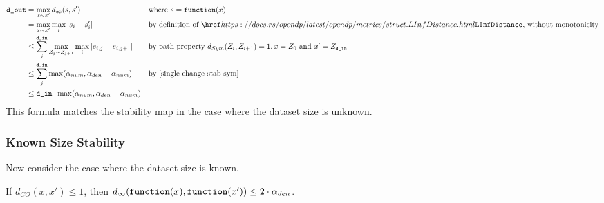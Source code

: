 \documentclass{article}
\begin{document}
\begin{align*} 
    \dout &= \max\limits_{x \sim x'} d_{\infty}(s, s') &&\text{where } s = \function(x)\\ 
    &= \max\limits_{x \sim x'} \max\limits_{i} |s_i - s'_i| &&\text{by definition of }\rustdoc{metrics/struct}{LInfDistance} \text{, without monotonicity} \\ 
    &\leq \sum_j^{\din} \max\limits_{Z_{j} \sim Z_{j+1}} \max\limits_{i} |s_{i,j} - s_{i,j+1}| &&\text{by path property } d_{Sym}(Z_i, Z_{i+1}) = 1, x = Z_0 \text{ and } x' = Z_\din \\ 
    &\leq \sum_j^{\din} \max(\alpha_{num}, \alpha_{den} - \alpha_{num}) &&\text{by \ref{single-change-stab-sym}} \\ 
    &\leq \din \cdot \max(\alpha_{num}, \alpha_{den} - \alpha_{num}) \\ 
\end{align*} 
\label{sec:unknown-size} 
This formula matches the stability map in the case where the dataset size is unknown. 
 
 
\subsubsection{Known Size Stability} 
\label{sec:known-size} 
Now consider the case where the dataset size is known. 
 
\begin{lemma} 
    \label{single-change-stab} 
    If $d_{CO}(x, x') \le 1$, then $d_\infty(\texttt{function}(x), \texttt{function}(x')) \le 2 \cdot \alpha_{den}$. 
\end{lemma} 
 
\end{document}
